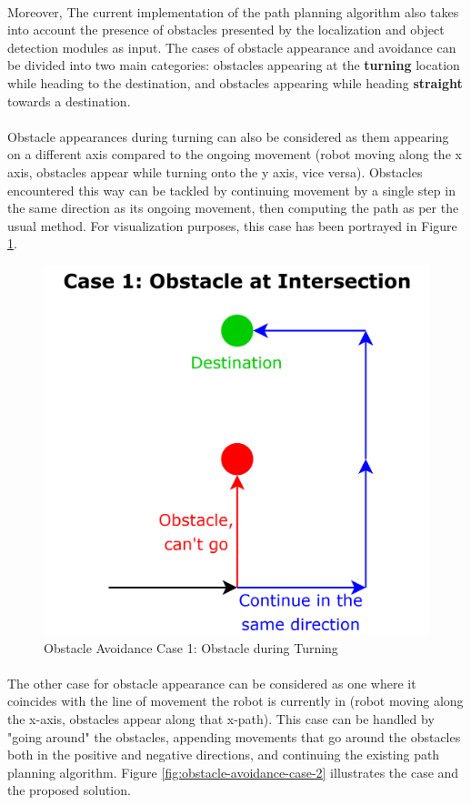 \paragraph*{}
Moreover, The current implementation of the path planning algorithm also takes into account the presence of obstacles presented by the localization and object detection modules as input. The cases of obstacle appearance and avoidance can be divided into two main categories: obstacles appearing at the \textbf{turning} location while heading to the destination, and obstacles appearing while heading \textbf{straight} towards a destination.

\paragraph*{}
Obstacle appearances during turning can also be considered as them appearing on a different axis compared to the ongoing movement (robot moving along the x axis, obstacles appear while turning onto the y axis, vice versa). Obstacles encountered this way can be tackled by continuing movement by a single step in the same direction as its ongoing movement, then computing the path as per the usual method. For visualization purposes, this case has been portrayed in Figure \ref{fig:obstacle-avoidance-case-1}.

\begin{figure} [H]
    \centering
    \includegraphics[width=0.55\linewidth]{midpoint_report/assets/images/formation/obstacle-avoidance-case1.png}
    \caption{Obstacle Avoidance Case 1: Obstacle during Turning}
    \label{fig:obstacle-avoidance-case-1}
\end{figure}

\paragraph*{}
The other case for obstacle appearance can be considered as one where it coincides with the line of movement the robot is currently in (robot moving along the x-axis, obstacles appear along that x-path). This case can be handled by "going around" the obstacles, appending movements that go around the obstacles both in the positive and negative directions, and continuing the existing path planning algorithm. Figure \ref{fig:obstacle-avoidance-case-2} illustrates the case and the proposed solution.

